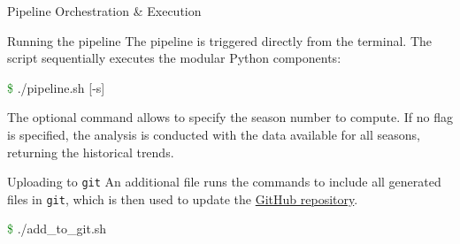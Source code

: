 \documentclass[10pt, aspectratio=169]{beamer}
\begin{document}
\begin{frame}[fragile]{Pipeline Orchestration \& Execution}
	\begin{block}{Running the pipeline}
        The pipeline is triggered directly from the terminal. The script sequentially executes the modular Python components:
        \begin{semiverbatim}
        \textcolor{green}{\$} ./pipeline.sh [-s]
        \end{semiverbatim}
	The optional command allows to specify the season number to compute. If no flag is specified, the analysis is conducted with the data available for all seasons, returning the historical trends.
    \end{block}
    \begin{block}{Uploading to \texttt{git}}
    An additional file runs the commands to include all generated files in \texttt{git}, which is then used to update the \href{https://www.github.com/pgrebolt/ICEChampionsLeague}{GitHub repository}.
        \begin{semiverbatim}
        \textcolor{green}{\$} ./add_to_git.sh
        \end{semiverbatim}
    \end{block}
\end{frame}
\end{document}
